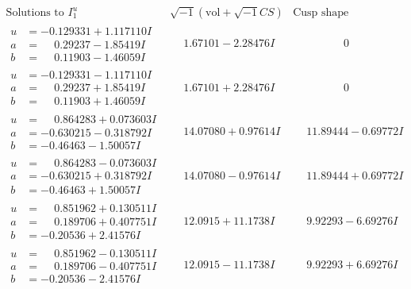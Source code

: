 \documentclass[1p]{elsarticle_modified}
\theoremstyle{definition}
\newcommand{\I}{\sqrt{-1}}
\begin{document}
$$\begin{array}{c|c|c}  
\text{Solutions to }I^u_{1}& \I (\text{vol} + \sqrt{-1}CS) & \text{Cusp shape}\\
 \hline 
\begin{aligned}
u &= -0.129331 + 1.117110 I \\
a &= \phantom{-}0.29237 - 1.85419 I \\
b &= \phantom{-}0.11903 - 1.46059 I\end{aligned}
 & \phantom{-}1.67101 - 2.28476 I & \phantom{-0.000000 } 0 \\ \hline\begin{aligned}
u &= -0.129331 - 1.117110 I \\
a &= \phantom{-}0.29237 + 1.85419 I \\
b &= \phantom{-}0.11903 + 1.46059 I\end{aligned}
 & \phantom{-}1.67101 + 2.28476 I & \phantom{-0.000000 } 0 \\ \hline\begin{aligned}
u &= \phantom{-}0.864283 + 0.073603 I \\
a &= -0.630215 - 0.318792 I \\
b &= -0.46463 - 1.50057 I\end{aligned}
 & \phantom{-}14.07080 + 0.97614 I & \phantom{-}11.89444 - 0.69772 I \\ \hline\begin{aligned}
u &= \phantom{-}0.864283 - 0.073603 I \\
a &= -0.630215 + 0.318792 I \\
b &= -0.46463 + 1.50057 I\end{aligned}
 & \phantom{-}14.07080 - 0.97614 I & \phantom{-}11.89444 + 0.69772 I \\ \hline\begin{aligned}
u &= \phantom{-}0.851962 + 0.130511 I \\
a &= \phantom{-}0.189706 + 0.407751 I \\
b &= -0.20536 + 2.41576 I\end{aligned}
 & \phantom{-}12.0915 + 11.1738 I & \phantom{-}9.92293 - 6.69276 I \\ \hline\begin{aligned}
u &= \phantom{-}0.851962 - 0.130511 I \\
a &= \phantom{-}0.189706 - 0.407751 I \\
b &= -0.20536 - 2.41576 I\end{aligned}
 & \phantom{-}12.0915 - 11.1738 I & \phantom{-}9.92293 + 6.69276 I \\ \hline\begin{aligned}

\end{aligned}
\end{array}$$
\end{document}
